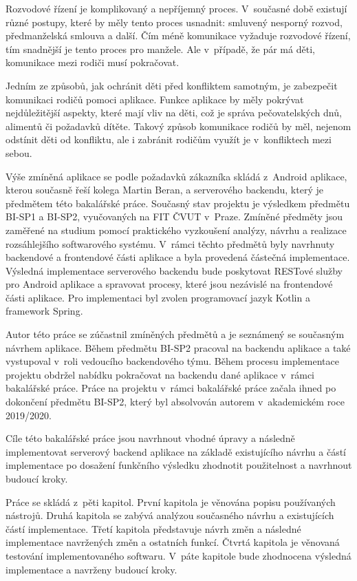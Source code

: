 
Rozvodové řízení je komplikovaný a nepříjemný proces. V~současné době existují různé postupy, které by měly tento proces usnadnit: smluvený nesporný rozvod, předmanželská smlouva a další. Čím méně komunikace vyžaduje rozvodové řízení, tím snadnější je tento proces pro manžele. Ale v~případě, že pár má děti, komunikace mezi rodiči musí pokračovat. 

Jedním ze způsobů, jak ochránit děti před konfliktem samotným, je zabezpečit komunikaci rodičů pomoci aplikace. Funkce aplikace by měly pokrývat nejdůležitější aspekty, které mají vliv na děti, což je správa pečovatelských dnů, alimentů či požadavků dítěte. Takový způsob komunikace rodičů by měl, nejenom odstínit děti od konfliktu, ale i zabránit rodičům využít je v~konfliktech mezi sebou.

Výše zmíněná aplikace se podle požadavků zákazníka skládá z~Android aplikace, kterou současně řeší kolega Martin Beran, a serverového backendu, který je předmětem této bakalářské práce. Současný stav projektu je výsledkem předmětu BI-SP1 a BI-SP2, vyučovaných na FIT ČVUT v~Praze. Zmíněné předměty jsou zaměřené na studium pomocí praktického vyzkoušení analýzy, návrhu a realizace rozsáhlejšího softwarového systému. V~rámci těchto předmětů byly navrhnuty backendové a frontendové části aplikace a byla provedená částečná implementace. 
Výsledná implementace serverového backendu bude poskytovat RESTové služby pro Android aplikace a spravovat procesy, které jsou nezávislé na frontendové části aplikace. Pro implementaci byl zvolen programovací jazyk Kotlin a framework Spring. 

Autor této práce se zúčastnil zmíněných předmětů a je seznámený se současným návrhem aplikace. Během předmětu BI-SP2 pracoval na backendu aplikace a také vystupoval v~roli vedoucího backendového týmu. Během procesu implementace projektu obdržel nabídku pokračovat na backendu dané aplikace v~rámci bakalářské práce. Práce na projektu v~rámci bakalářské práce začala ihned po dokončení předmětu BI-SP2, který byl absolvován autorem v~akademickém roce 2019/2020.

Cíle této bakalářské práce jsou navrhnout vhodné úpravy a následně implementovat serverový backend aplikace na základě existujícího návrhu a částí implementace po dosažení funkčního výsledku zhodnotit použitelnost a navrhnout budoucí kroky.

Práce se skládá z~pěti kapitol. První kapitola je věnována popisu používaných nástrojů. Druhá kapitola se zabývá analýzou současného návrhu a existujících částí implementace. Třetí kapitola představuje návrh změn a následné implementace navržených změn a ostatních funkcí. Čtvrtá kapitola je věnovaná testování implementovaného softwaru. V~páte kapitole bude zhodnocena výsledná implementace a navrženy budoucí kroky.






